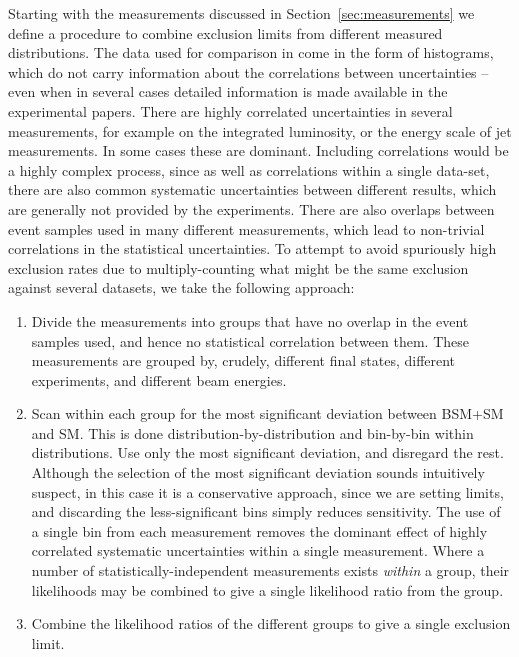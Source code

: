 \documentclass[floatfix]{article}
\begin{document}
Starting with the measurements discussed in Section~\ref{sec:measurements} 
we define a procedure to combine exclusion limits from different measured distributions.
The data used for comparison in \rivet come in the form of histograms, which do not carry information about the correlations between uncertainties -- 
even when in several cases detailed information is made available in the experimental papers. There are highly correlated uncertainties in several measurements, 
for example on the integrated luminosity, or the energy scale of jet measurements. In some cases these are dominant. Including correlations would be a highly 
complex process, since as well as correlations within a single data-set, there are also common systematic uncertainties between different
results, which are generally not provided by the experiments. There are also overlaps between event samples used in many different measurements, which lead to
non-trivial correlations in the statistical uncertainties. To attempt to avoid spuriously high exclusion rates due to multiply-counting what might be the 
same exclusion against several datasets, we take the following approach:
\begin{enumerate}
\item Divide the measurements into groups that have no overlap in the event samples used, and hence no statistical correlation 
between them. These measurements are grouped by, crudely, different final states, different experiments, and different beam 
energies.
\item Scan within each group for the most significant deviation between BSM+SM and SM. This is done distribution-by-distribution and bin-by-bin within distributions.
Use only the most significant deviation, and disregard the rest. Although the selection of the most significant deviation sounds intuitively suspect, in this case it
is a conservative approach, since we are setting limits, and discarding the less-significant bins simply reduces sensitivity. 
The use of a single bin from each measurement removes the dominant effect of highly correlated 
systematic uncertainties within a single measurement. Where a number
of statistically-independent measurements exists {\it within} a group, their likelihoods may be combined to give a single likelihood ratio from the group.
\item Combine the likelihood ratios of the different groups to give a single exclusion limit.
\end{enumerate}
\end{document}
